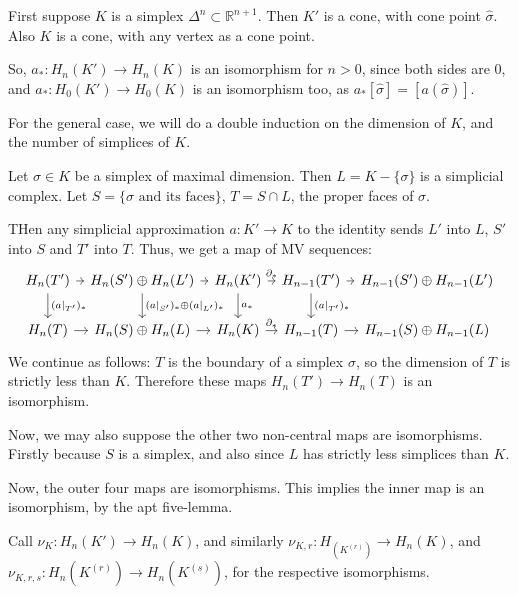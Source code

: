 \documentclass[12pt]{article}
\begin{document}
\begin{proofbox}
	First suppose $K$ is a simplex $\Delta^n \subset \mathbb{R}^{n+1}$. Then $K'$ is a cone, with cone point $\hat \sigma$. Also $K$ is a cone, with any vertex as a cone point.

	So, $a_\ast : H_n(K') \to H_n(K)$ is an isomorphism for $n > 0$, since both sides are 0, and $a_\ast : H_0(K') \to H_0(K)$ is an isomorphism too, as $a_\ast[\hat \sigma] = [a(\hat \sigma)]$.

	For the general case, we will do a double induction on the dimension of $K$, and the number of simplices of $K$.

	Let $\sigma \in K$ be a simplex of maximal dimension. Then $L = K - \{\sigma\}$ is a simplicial complex. Let  $S = \{\sigma \text { and its faces}\}$, $T = S \cap L$, the proper faces of $\sigma$.

	THen any simplicial approximation $a : K' \to K$ to the identity sends $L'$ into $L$, $S'$ into $S$ and $T'$ into $T$. Thus, we get a map of MV sequences:
	\begin{equation*}
		\begin{tikzcd}[column sep = tiny]
			H_n(T') \arrow[r] \arrow[d, "{(a|_{T'})_\ast}"] & H_n(S') \oplus H_n(L') \arrow[r] \arrow[d, "{(a|_{S'})_\ast \oplus (a|_{L'})_\ast}"] & H_n(K') \arrow[r, "\partial_\ast"] \arrow[d, "{a_\ast}"] & H_{n-1}(T') \arrow[r] \arrow[d, "{(a|_{T'})_\ast}"] & H_{n-1}(S') \oplus H_{n-1}(L') \\
H_n(T) \arrow[r] & H_n(S) \oplus H_n(L) \arrow[r] & H_n(K) \arrow[r, "\partial_\ast"] & H_{n-1}(T) \arrow[r] & H_{n-1}(S) \oplus H_{n-1}(L)
		\end{tikzcd}
	\end{equation*}
	We continue as follows: $T$ is the boundary of a simplex $\sigma$, so the dimension of $T$ is strictly less than $K$. Therefore these maps $H_n(T') \to H_n(T)$ is an isomorphism.

	Now, we may also suppose the other two non-central maps are isomorphisms. Firstly because $S$ is a simplex, and also since $L$ has strictly less simplices than $K$.

	Now, the outer four maps are isomorphisms. This implies the inner map is an isomorphism, by the apt five-lemma.
\end{proofbox}


Call $\nu_K: H_n(K') \to H_n(K)$, and similarly $\nu_{K, r} : H_(K^{(r)}) \to H_n(K)$, and $\nu_{K, r, s} : H_n(K^{(r)}) \to H_n(K^{(s)})$, for the respective isomorphisms.
\end{document}
